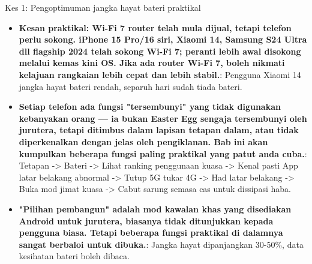 \begin{tcbinfo}{Kes 1: Pengoptimuman jangka hayat bateri praktikal}
\begin{itemize}
  \item \textbf{Kesan praktikal: Wi-Fi 7 router telah mula dijual, tetapi telefon perlu sokong. iPhone 15 Pro/16 siri, Xiaomi 14, Samsung S24 Ultra dll flagship 2024 telah sokong Wi-Fi 7; peranti lebih awal disokong melalui kemas kini OS. Jika ada router Wi-Fi 7, boleh nikmati kelajuan rangkaian lebih cepat dan lebih stabil.}: Pengguna Xiaomi 14 jangka hayat bateri rendah, separuh hari sudah tiada bateri.
  \item \textbf{Setiap telefon ada fungsi "tersembunyi" yang tidak digunakan kebanyakan orang — ia bukan Easter Egg sengaja tersembunyi oleh jurutera, tetapi ditimbus dalam lapisan tetapan dalam, atau tidak diperkenalkan dengan jelas oleh pengiklanan. Bab ini akan kumpulkan beberapa fungsi paling praktikal yang patut anda cuba.}: Tetapan -> Bateri -> Lihat ranking penggunaan kuasa -> Kenal pasti App latar belakang abnormal -> Tutup 5G tukar 4G -> Had latar belakang -> Buka mod jimat kuasa -> Cabut sarung semasa cas untuk dissipasi haba.
  \item \textbf{"Pilihan pembangun" adalah mod kawalan khas yang disediakan Android untuk jurutera, biasanya tidak ditunjukkan kepada pengguna biasa. Tetapi beberapa fungsi praktikal di dalamnya sangat berbaloi untuk dibuka.}: Jangka hayat dipanjangkan 30-50\%, data kesihatan bateri boleh dibaca.
\end{itemize}

\end{tcbinfo}
